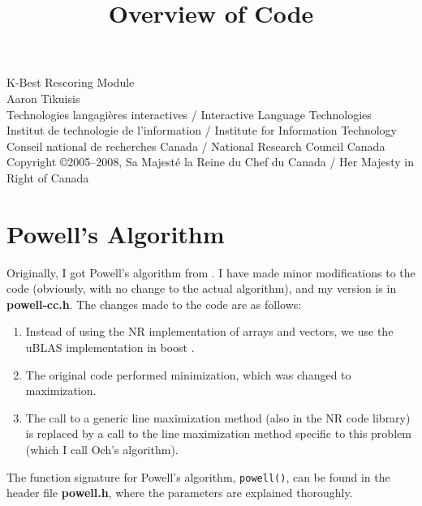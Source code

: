 \documentclass[12pt]{amsart}
\newcommand{\file}{\textbf} \newcommand{\url}{\underline}
\newcommand{\code}[1]{{\small \texttt{#1}}}
\begin{document}
\title{Overview of Code} \maketitle

{\tiny
 \noindent K-Best Rescoring Module\\ Aaron Tikuisis\\
 Technologies langagi{\`e}res interactives / Interactive Language Technologies\\
 Institut de technologie de l'information / Institute for Information Technology\\
 Conseil national de recherches Canada / National Research Council Canada\\
 Copyright \copyright 2005--2008, Sa Majest{\'e} la Reine du Chef du Canada /
     Her Majesty in Right of Canada
}



\section*{Powell's Algorithm}

Originally, I got Powell's algorithm from \cite{NR-C++}.  I have made minor
modifications to the code (obviously, with no change to the actual algorithm),
and my version is in \file{powell-cc.h}.  The changes made to the code are
as follows:

\begin{enumerate}
\item Instead of using the NR implementation of arrays and vectors, we use the
      uBLAS implementation in boost \cite{uBLAS}.

\item The original code performed minimization, which was changed to
      maximization.

\item The call to a generic line maximization method (also in the NR code
      library) is replaced by a call to the line maximization method specific
      to this problem (which I call Och's algorithm).
\end{enumerate}

The function signature for Powell's algorithm, \code{powell()}, can be found in
the header file \file{powell.h}, where the parameters are explained thoroughly.
\end{document}
